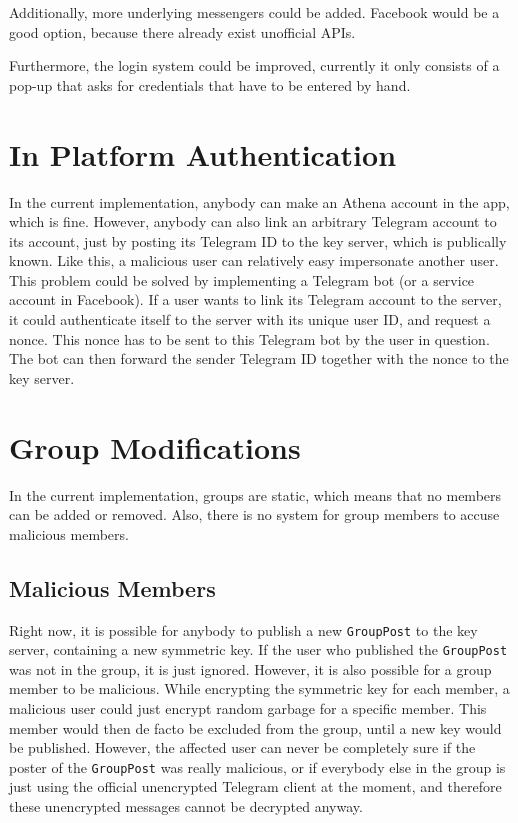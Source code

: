 \documentclass[a4paper, oneside]{discothesis}
\begin{document}
Additionally, more underlying messengers could be added. Facebook would be a good option, because there already exist unofficial APIs.

Furthermore, the login system could be improved, currently it only consists of a pop-up that asks for credentials that have to be entered by hand.

\section{In Platform Authentication}

In the current implementation, anybody can make an Athena account in the app, which is fine. However, anybody can also link an arbitrary Telegram account to its account, just by posting its Telegram ID to the key server, which is publically known. Like this, a malicious user can relatively easy impersonate another user. This problem could be solved by implementing a Telegram bot (or a service account in Facebook). If a user wants to link its Telegram account to the server, it could authenticate itself to the server with its unique user ID, and request a nonce. This nonce has to be sent to this Telegram bot by the user in question. The bot can then forward the sender Telegram ID together with the nonce to the key server.

\section{Group Modifications}

In the current implementation, groups are static, which means that no members can be added or removed. Also, there is no system for group members to accuse malicious members.

\subsection{Malicious Members}

Right now, it is possible for anybody to publish a new \texttt{GroupPost} to the key server, containing a new symmetric key. If the user who published the \texttt{GroupPost} was not in the group, it is just ignored. However, it is also possible for a group member to be malicious. While encrypting the symmetric key for each member, a malicious user could just encrypt random garbage for a specific member. This member would then de facto be excluded from the group, until a new key would be published. However, the affected user can never be completely sure if the poster of the \texttt{GroupPost} was really malicious, or if everybody else in the group is just using the official unencrypted Telegram client at the moment, and therefore these unencrypted messages cannot be decrypted anyway.
\end{document}
